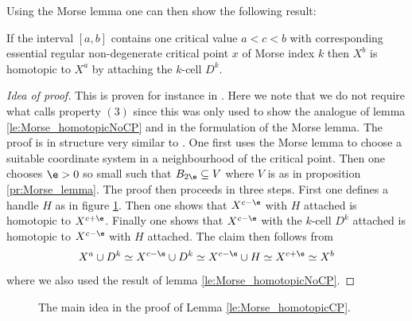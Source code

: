 Using the Morse lemma one can then show the following result:
\begin{lemma}
  \label{le:Morse_homotopicCP}
  If the interval $[a,b]$ contains one critical value $a<c<b$ with corresponding essential regular non-degenerate critical point
  $x$ of Morse index $k$
  then $X^b$ is homotopic to $X^a$ by attaching the $k$-cell
  $D^{k}$.
\end{lemma}
\begin{proof}[Idea of proof]
  This is proven for instance in \cite[Theorem 8]{Handron2002}.
  Here we note that we do not require what \cite{Handron2002} calls property $(3)$
  since this was only used to show the analogue of lemma \ref{le:Morse_homotopicNoCP} and in the formulation of the
  Morse lemma.
  The proof is in structure very similar to \cite{Milnor1963}.
  One first uses the Morse lemma to choose a suitable coordinate system
  in a neighbourhood of the critical point.
  Then one chooses $\e>0$ so small such that $B_{2\e}\subseteq V$ where $V$ is as in proposition \ref{pr:Morse_lemma}.
  The proof then proceeds in three steps.
  First one defines a handle $H$ as in figure \ref{fi:morseIneq_CP}.
  Then one shows that $X^{c-\e}$ with $H$ attached is homotopic to $X^{c+\e}$.
  Finally one shows that $X^{c-\e}$ with the $k$-cell $D^k$ attached is homotopic to
  $X^{c-\e}$ with $H$ attached.
  The claim then follows from
  \begin{align*}
    X^a\cup D^k
    \simeq X^{c-\e}\cup D^k
    \simeq X^{c-\e}\cup H
    \simeq X^{c+\e}
    \simeq X^b
  \end{align*}
  where we also used the result of lemma \ref{le:Morse_homotopicNoCP}.
\end{proof}
\begin{figure}
  \centering
  \begin{subfigure}{0.45\textwidth}
    \centering
    \def\svgwidth{\textwidth}
    
  \end{subfigure}
  \hfill
  \begin{subfigure}{0.45\textwidth}
    \centering
    \def\svgwidth{\textwidth}
    
  \end{subfigure}
  \caption{The main idea in the proof of Lemma \ref{le:Morse_homotopicCP}.}
  \label{fi:morseIneq_CP}
\end{figure}

